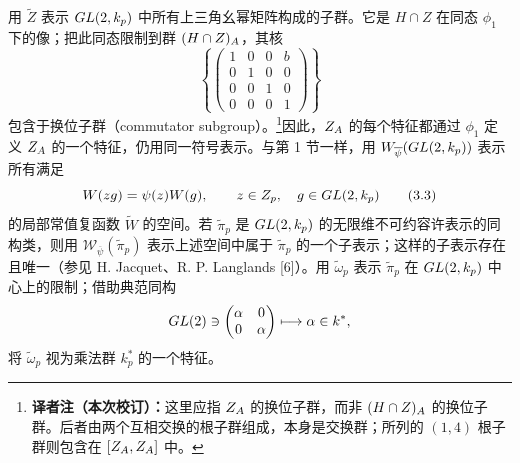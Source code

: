 用 $\widetilde Z$ 表示 $GL(2,k_p)$ 中所有上三角幺幂矩阵构成的子群。它是 $H\cap Z$ 在同态 $\phi_1$ 下的像；把此同态限制到群 $(H\cap Z)_A$，其核
\[
 \left\{\begin{pmatrix}1&0&0&b\\0&1&0&0\\0&0&1&0\\0&0&0&1\end{pmatrix}\right\}
\]
包含于换位子群（commutator subgroup）。\footnote{\textbf{译者注（本次校订）：}这里应指 $Z_A$ 的换位子群，而非 $(H\cap Z)_A$ 的换位子群。后者由两个互相交换的根子群组成，本身是交换群；所列的 $(1,4)$ 根子群则包含在 $[Z_A,Z_A]$ 中。}因此，$Z_A$ 的每个特征都通过 $\phi_1$ 定义 $Z_A$ 的一个特征，仍用同一符号表示。与第 1 节一样，用 $W_{\overline\psi}(GL(2,k_p))$ 表示所有满足
\begin{equation}
 W(zg)=\psi(z)W(g),
 \qquad z\in Z_p,\quad g\in GL(2,k_p)
 \tag{3.3}
\end{equation}
的局部常值复函数 $\widetilde W$ 的空间。若 $\widetilde\pi_p$ 是 $GL(2,k_p)$ 的无限维不可约容许表示的同构类，则用 $\mathcal W_{\overline\psi}(\widetilde\pi_p)$ 表示上述空间中属于 $\widetilde\pi_p$ 的一个子表示；这样的子表示存在且唯一（参见 H. Jacquet、R. P. Langlands [6]）。用 $\widetilde\omega_p$ 表示 $\widetilde\pi_p$ 在 $GL(2,k_p)$ 中心上的限制；借助典范同构
\[
 GL(2)\ni\begin{pmatrix}\alpha&0\\0&\alpha\end{pmatrix}\longmapsto\alpha\in k^*,
\]
将 $\widetilde\omega_p$ 视为乘法群 $k_p^*$ 的一个特征。

